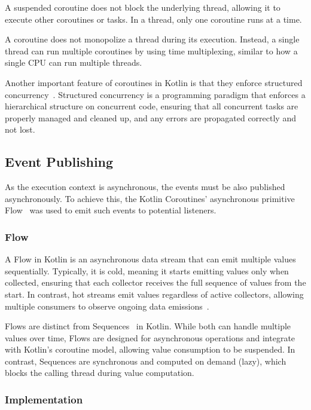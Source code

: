 A suspended coroutine does not block the underlying thread, allowing it to execute other coroutines or tasks.
In a thread, only one coroutine runs at a time.

A coroutine does not monopolize a thread during its execution.
Instead, a single thread can run multiple coroutines by using time multiplexing,
similar to how a single CPU can run multiple threads.

Another important feature of coroutines in Kotlin is that they enforce structured concurrency~\cite{kotlin-coroutines}.
Structured concurrency is a programming paradigm that enforces a hierarchical structure on concurrent code, ensuring that all concurrent tasks are properly managed and cleaned up, and any errors are propagated correctly and not lost.

\subsection{Event Publishing}\label{subsec:event-publishing}

As the execution context is asynchronous, the events must be also published asynchronously.
To achieve this, the Kotlin Coroutines'
asynchronous primitive Flow~\cite{kotlin-flow} was used to emit such events to potential listeners.

\subsubsection{Flow}\label{subsubsec:flow}

A Flow in Kotlin is an asynchronous data stream that can emit multiple values sequentially.
Typically, it is cold, meaning it starts emitting values only when collected, ensuring that each collector receives the full sequence of values from the start.
In contrast, hot streams emit values regardless of active collectors, allowing multiple consumers to observe ongoing data emissions~\cite{android-stateflow-sharedflow, kotlin-flow}.

Flows are distinct from Sequences~\cite{kotlin-sequences} in Kotlin.
While both can handle multiple values over time, Flows are designed for asynchronous operations and integrate with Kotlin's coroutine model, allowing value consumption to be suspended.
In contrast, Sequences are synchronous and computed on demand (lazy),
which blocks the calling thread during value computation.

\subsubsection{Implementation}\label{subsubsec:event-publishing-implementation}

